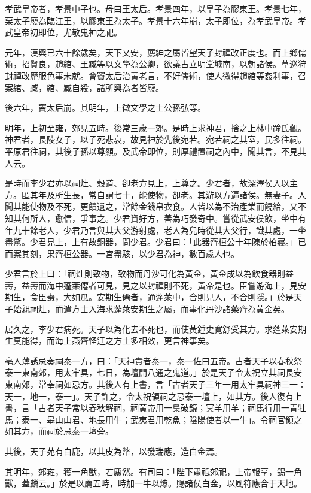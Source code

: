 
\begin{pinyinscope}
孝武皇帝者，孝景中子也。母曰王太后。孝景四年，以皇子為膠東王。孝景七年，栗太子廢為臨江王，以膠東王為太子。孝景十六年崩，太子即位，為孝武皇帝。孝武皇帝初即位，尤敬鬼神之祀。

元年，漢興已六十餘歲矣，天下乂安，薦紳之屬皆望天子封禪改正度也。而上鄉儒術，招賢良，趙綰、王臧等以文學為公卿，欲議古立明堂城南，以朝諸侯。草巡狩封禪改歷服色事未就。會竇太后治黃老言，不好儒術，使人微得趙綰等姦利事，召案綰、臧，綰、臧自殺，諸所興為者皆廢。

後六年，竇太后崩。其明年，上徵文學之士公孫弘等。

明年，上初至雍，郊見五畤。後常三歲一郊。是時上求神君，捨之上林中蹄氏觀。神君者，長陵女子，以子死悲哀，故見神於先後宛若。宛若祠之其室，民多往祠。平原君往祠，其後子孫以尊顯。及武帝即位，則厚禮置祠之內中，聞其言，不見其人云。

是時而李少君亦以祠灶、穀道、卻老方見上，上尊之。少君者，故深澤侯入以主方。匿其年及所生長，常自謂七十，能使物，卻老。其游以方遍諸侯。無妻子。人聞其能使物及不死，更饋遺之，常餘金錢帛衣食。人皆以為不治產業而饒給，又不知其何所人，愈信，爭事之。少君資好方，善為巧發奇中。嘗從武安侯飲，坐中有年九十餘老人，少君乃言與其大父游射處，老人為兒時從其大父行，識其處，一坐盡驚。少君見上，上有故銅器，問少君。少君曰：「此器齊桓公十年陳於柏寢。」已而案其刻，果齊桓公器。一宮盡駭，以少君為神，數百歲人也。

少君言於上曰：「祠灶則致物，致物而丹沙可化為黃金，黃金成以為飲食器則益壽，益壽而海中蓬萊僊者可見，見之以封禪則不死，黃帝是也。臣嘗游海上，見安期生，食臣棗，大如瓜。安期生僊者，通蓬萊中，合則見人，不合則隱。」於是天子始親祠灶，而遣方士入海求蓬萊安期生之屬，而事化丹沙諸藥齊為黃金矣。

居久之，李少君病死。天子以為化去不死也，而使黃錘史寬舒受其方。求蓬萊安期生莫能得，而海上燕齊怪迂之方士多相效，更言神事矣。

亳人薄誘忌奏祠泰一方，曰：「天神貴者泰一，泰一佐曰五帝。古者天子以春秋祭泰一東南郊，用太牢具，七日，為壇開八通之鬼道。」於是天子令太祝立其祠長安東南郊，常奉祠如忌方。其後人有上書，言「古者天子三年一用太牢具祠神三一：天一，地一，泰一」。天子許之，令太祝領祠之忌泰一壇上，如其方。後人復有上書，言「古者天子常以春秋解祠，祠黃帝用一梟破鏡；冥羊用羊；祠馬行用一青牡馬；泰一、皋山山君、地長用牛；武夷君用乾魚；陰陽使者以一牛」。令祠官領之如其方，而祠於忌泰一壇旁。

其後，天子苑有白鹿，以其皮為幣，以發瑞應，造白金焉。

其明年，郊雍，獲一角獸，若麃然。有司曰：「陛下肅祗郊祀，上帝報享，錫一角獸，蓋麟云。」於是以薦五畤，畤加一牛以燎。賜諸侯白金，以風符應合于天地。


\end{pinyinscope}
